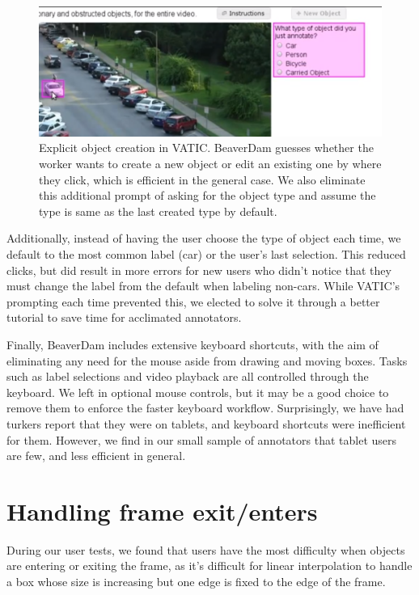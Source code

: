 \begin{figure}[h]
\includegraphics[width=14cm]{figs/vatic_create.png}
\centering
\caption{Explicit object creation in VATIC. BeaverDam guesses whether the worker wants to create a new object or edit an existing one by where they click, which is efficient in the general case. We also eliminate this additional prompt of asking for the object type and assume the type is same as the last created type by default.}
\end{figure}

Additionally, instead of having the user choose the type of object each time, we default to the most common label (car) or the user's last selection.
This reduced clicks, but did result in more errors for new users who didn't notice that they must change the label from the default when labeling non-cars.
While VATIC's prompting each time prevented this, we elected to solve it through a better tutorial to save time for acclimated annotators.

Finally, BeaverDam includes extensive keyboard shortcuts, with the aim of eliminating any need for the mouse aside from drawing and moving boxes.
Tasks such as label selections and video playback are all controlled through the keyboard.
We left in optional mouse controls, but it may be a good choice to remove them to enforce the faster keyboard workflow.
Surprisingly, we have had turkers report that they were on tablets, and keyboard shortcuts were inefficient for them.
However, we find in our small sample of annotators that tablet users are few, and less efficient in general.

\section{Handling frame exit/enters}

During our user tests, we found that users have the most difficulty when objects are entering or exiting the frame, as it's difficult for linear interpolation to handle a box whose size is increasing but one edge is fixed to the edge of the frame.

